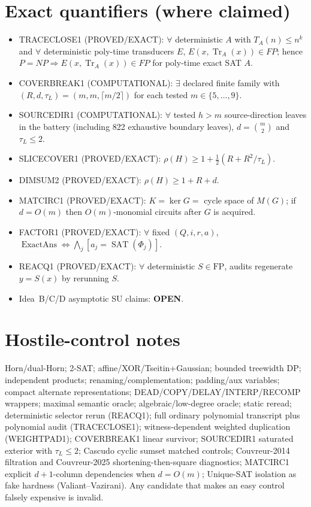\documentclass[11pt]{article}
\begin{document}
\section*{Exact quantifiers (where claimed)}
\begin{itemize}
\item TRACECLOSE1 (PROVED/EXACT): $\forall$ deterministic $A$ with $T_A(n)\le n^k$ and
$\forall$ deterministic poly-time transducers $E$, $E(x,\operatorname{Tr}_A(x))\in FP$;
hence $P=NP\Rightarrow E(x,\operatorname{Tr}_A(x))\in FP$ for poly-time exact SAT $A$.
\item COVERBREAK1 (COMPUTATIONAL): $\exists$ declared finite family with
$(R,d,\tau_L)=(m,m,\lceil m/2\rceil)$ for each tested $m\in\{5,\ldots,9\}$.
\item SOURCEDIR1 (COMPUTATIONAL): $\forall$ tested $h>m$ source-direction leaves in the battery
(including 822 exhaustive boundary leaves), $d=\binom{m}{2}$ and $\tau_L\le 2$.
\item SLICECOVER1 (PROVED/EXACT): $\rho(H)\ge 1+\tfrac12(R+R^2/\tau_L)$.
\item DIMSUM2 (PROVED/EXACT): $\rho(H)\ge 1+R+d$.
\item MATCIRC1 (PROVED/EXACT): $K=\ker G=$ cycle space of $M(G)$; if $d=O(m)$ then
$O(m)$-monomial circuits after $G$ is acquired.
\item FACTOR1 (PROVED/EXACT): $\forall$ fixed $(Q,i,r,a)$,
$\operatorname{ExactAns}\iff\bigwedge_j[a_j=\operatorname{SAT}(\Phi_j)]$.
\item REACQ1 (PROVED/EXACT): $\forall$ deterministic $S\in\mathrm{FP}$, audits regenerate $y=S(x)$
by rerunning $S$.
\item Idea~B/C/D asymptotic SU claims: \textbf{OPEN}.
\end{itemize}

\section*{Hostile-control notes}
Horn/dual-Horn; 2-SAT; affine/XOR/Tseitin+Gaussian; bounded treewidth DP; independent products;
renaming/complementation; padding/aux variables; compact alternate representations;
DEAD/COPY/DELAY/INTERP/RECOMP wrappers; maximal semantic oracle; algebraic/low-degree oracle;
static reread; deterministic selector rerun (REACQ1); full ordinary polynomial transcript plus
polynomial audit (TRACECLOSE1); witness-dependent weighted duplication (WEIGHTPAD1);
COVERBREAK1 linear survivor; SOURCEDIR1 saturated exterior with $\tau_L\le 2$; Cascudo cyclic
sumset matched controls; Couvreur-2014 filtration and Couvreur-2025 shortening-then-square
diagnostics; MATCIRC1 explicit $d+1$-column dependencies when $d=O(m)$; Unique-SAT isolation
as fake hardness (Valiant--Vazirani). Any candidate that makes an easy control falsely
expensive is invalid.
\end{document}
